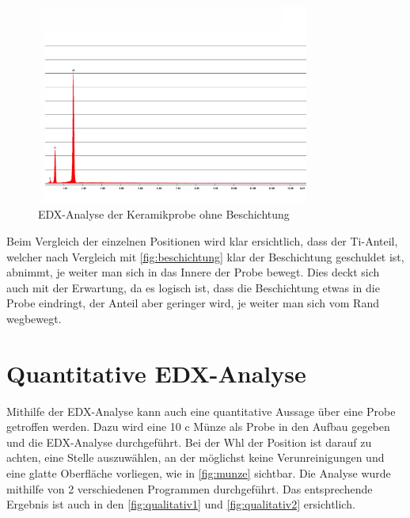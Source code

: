 \documentclass[12pt,english,ngerman]{scrartcl}
\begin{document}
\begin{figure}[H]
	\begin{center}
		\includegraphics[width =0.8\textwidth]{./figures/keramik.png}
	\end{center}
	\caption{EDX-Analyse der Keramikprobe ohne Beschichtung \cite{sein_foto}}
    \label{fig:keramik}
\end{figure}

Beim Vergleich der einzelnen Positionen wird klar ersichtlich, dass der Ti-Anteil, welcher nach Vergleich mit \autoref{fig:beschichtung}
klar der Beschichtung geschuldet ist, abnimmt, je weiter man sich in das Innere der Probe bewegt. Dies deckt sich auch
mit der Erwartung, da es logisch ist, dass die Beschichtung etwas in die Probe eindringt, der Anteil aber geringer wird, je
weiter man sich vom Rand wegbewegt.


\section{Quantitative EDX-Analyse}

Mithilfe der EDX-Analyse kann auch eine quantitative Aussage über eine Probe getroffen werden. Dazu wird eine 10 c 
Münze als Probe in den Aufbau gegeben und die EDX-Analyse durchgeführt. Bei der Whl der Position ist darauf zu 
achten, eine Stelle auszuwählen, an der möglichst keine Verunreinigungen und eine glatte Oberfläche vorliegen, wie
in \autoref{fig:munze} sichtbar. Die Analyse wurde mithilfe von 2 verschiedenen Programmen durchgeführt. Das 
entsprechende Ergebnis ist auch in den \autoref{fig:qualitativ1} und \autoref{fig:qualitativ2} ersichtlich.
\end{document}
